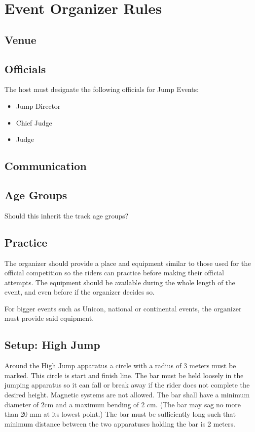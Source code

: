 \chapter{Event Organizer Rules}

\section{Venue}

\section{Officials}

The host must designate the following officials for Jump Events:
\begin{itemize}
\item Jump Director
\item Chief Judge
\item Judge
\end{itemize}

\begin{comment2016}
\section{Communication}
\end{comment2016}


\begin{comment2016}
\section{Age Groups}

Should this inherit the track age groups?
\end{comment2016}

\section{Practice}

The organizer should provide a place and equipment similar to those used for the official competition so the riders can practice before making their official attempts.
The equipment should be available during the whole length of the event, and even before if the organizer decides so.

For bigger events such as Unicon, national or continental events, the organizer must provide said equipment.

\section{Setup: High Jump}
Around the High Jump apparatus a circle with a radius of 3 meters must be marked.
This circle is start and finish line.
The bar must be held loosely in the jumping apparatus so it can fall or break away if the rider does not complete the desired height.
Magnetic systems are not allowed.
The bar shall have a minimum diameter of 2cm and a maximum bending of 2 cm.
(The bar may sag no more than 20 mm at its lowest point.)
The bar must be sufficiently long such that minimum distance between the two apparatuses holding the bar is 2 meters.

